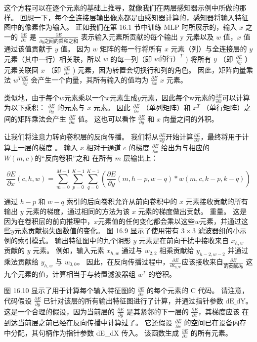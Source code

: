 这个方程可以在逐个元素的基础上推导，就像我们在两层感知器示例中所做的那样。 回想一下，每个全连接层输出像素都是由感知器计算的，感知器将输入特征图中的像素作为输入。 正如我们在第 16.1 节中训练 MLP 时所展示的，输入 $x$ 之一的 $\frac{\partial E}{\partial x}$ 是 $\frac{\partial E}{\partial y 之间的乘积之和 }$ 表示输入元素所贡献的每个输出 $\mathrm{y}$ 元素以及 $w$ 值，$x$ 值通过该值贡献于 $y$ 值。 因为 $w$ 矩阵的每一行将所有 $x$ 元素（列）与全连接层的 $y$ 元素（其中一行）相关联，所以 $w$ 的每一列（即 $w 的行） ^{T}$ ) 将所有 $y$ （即 $\frac{\partial E}{\partial y}$ ）元素关联回 $x$ （即 $\frac{\partial E}{\partial x}$ ) 元素，因为转置会切换行和列的角色。 因此，矩阵向量乘法 $w^{T} \frac{\partial E}{\partial y}$ 会产生一个向量，其所有输入的值均为 $\frac{\partial E}{\partial x}$ $x$ 元素。

类似地，由于每个$w$元素乘以一个$x$元素生成$y$元素，因此每个w元素的$\frac{\partial E}{\partial w}$可以计算为以下乘积： $\frac{\partial E}{\partial y}$ 的元素与 $x$ 元素。 因此 $\frac{\partial E}{\partial v}$ （单列矩阵）和 $x^{T}$ （单行矩阵）之间的矩阵乘法会产生 $\frac{\partial E}{\partial w}$ 值。 这也可以看作 $\frac{\partial E}{\partial y}$ 和 $x$ 向量之间的外积。

让我们将注意力转向卷积层的反向传播。 我们将从$\frac{\partial E}{\partial y}$开始计算$\frac{\partial E}{\partial x}$，最终将用于计算上一层的梯度 。 输入 $x$ 相对于通道 $c$ 的梯度 $\frac{\partial E}{\partial x}$ 给出为与相应的 $W(m, c) 的“反向卷积”之和 $ 在所有 $m$ 层输出上：

$$
\frac{\partial E}{\partial x}(c, h, w)=\sum_{m=0}^{M-1} \sum_{p=0}^{K-1} \sum_{q =0}^{K-1}\left(\frac{\partial E}{\partial y}(m, h-p, w-q) * w(m, c, k-p, k-q)\right)
$$

通过 $h-p$ 和 $w-q$ 索引的后向卷积允许从前向卷积中的 $x$ 元素接收贡献的所有输出 $y$ 元素的梯度，通过相同的方法为该 $x$ 元素的梯度做出贡献。 重量。 这是因为在卷积层的前向推理中，$x$元素值的任何变化都会乘以这些$w$元素，并通过这些$y$元素贡献损失函数值的变化。 图 16.9 显示了使用带有 $3 \times 3$ 滤波器组的小示例的索引模式。 输出特征图中的九个阴影 $y$ 元素是在前向干扰中接收来自 $x_{h, w}$ 贡献的 $y$ 元素。 例如，输入元素 $x_{h, w}$ 通过与 $w_{2,2}$ 相乘贡献给 $y_{h-2, w-2}$ 并通过乘法贡献给 $y_{h, w}$ 与 $w_{0,0}$。 因此，在反向传播过程中，$\frac{\partial E}{\partial \mathrm{x}_{\mathrm{h}, \mathrm{w}}}$应该接收来自$\frac{\partial E}{的贡献 \partial y}$ 这九个元素的值，计算相当于与转置滤波器组 $w^{T}$ 的卷积。

图 16.10 显示了用于计算每个输入特征图的 $\frac{\partial E}{\partial x}$ 的每个元素的 $\mathrm{C}$ 代码。 请注意，代码假设 $\frac{\partial E}{\partial y}$ 已针对该层的所有输出特征图进行了计算，并通过指针参数 $\mathrm{dE} \_\mathrm{ dY}$。 这是一个合理的假设，因为当前层的 $\frac{\partial E}{\partial y}$ 是其紧邻的下一层的 $\frac{\partial E}{\partial x}$，其梯度应该 在到达当前层之前已经在反向传播中计算过了。 它还假设 $\frac{\partial E}{\partial x}$ 的空间已在设备内存中分配，其句柄作为指针参数 dE\_dX 传入。 该函数生成 $\frac{\partial E}{\partial x}$ 的所有元素。

